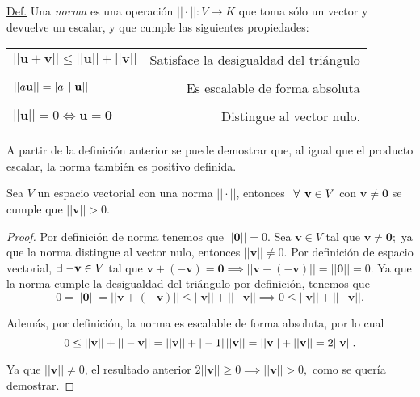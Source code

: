 \documentclass[12pt]{article}
\newenvironment{corolario}[2][Corolario]{\begin{trivlist}
\item[\hskip \labelsep {\bfseries #1}]}{\end{trivlist}}
\begin{document}
\begin{tcolorbox}
\underline{Def.} Una \textit{norma} es una operación $||\cdot||:V\rightarrow K$ que toma sólo un vector y devuelve un escalar, y que cumple las siguientes propiedades:

\begin{center}
    \begin{tabular}{lr}
        $||\mathbf{u}+\mathbf{v}|| \leq ||\mathbf{u}|| + ||\mathbf{v}||$ & Satisface la desigualdad del triángulo \\ \\
        $||a\mathbf{u}|| = |a|\hspace{0.5mm}||\mathbf{u}||$ & Es escalable de forma absoluta \\ \\
        $||\mathbf{u}||=0\iff \mathbf{u}=\mathbf{0}$ & Distingue al vector nulo.
    \end{tabular}
\end{center}

\end{tcolorbox}{}

A partir de la definición anterior se puede demostrar que, al igual que el producto escalar, la norma también es positivo definida.

\begin{corolario} {}
    Sea $V$ un espacio vectorial con una norma $||\cdot ||$, entonces $\hspace{1.5mm}\forall\hspace{1.5mm} \mathbf{v}\in V$ con $\mathbf{v}\neq\mathbf{0}$ se cumple que $||\mathbf{v}||>0.$

\begin{proof}
    Por definición de norma tenemos que $||\mathbf{0}||=0$. Sea $\mathbf{v}\in V$ tal que $\mathbf{v}\neq\mathbf{0};$ ya que la norma distingue al vector nulo, entonces $||\mathbf{v}||\neq 0.$ Por definición de espacio vectorial, $\exists\hspace{1mm} \mathbf{-v}\in V$ tal que $\mathbf{v}+(-\mathbf{v})=\mathbf{0}\implies ||\mathbf{v}+(-\mathbf{v})||=||\mathbf{0}||=0$. Ya que la norma cumple la desigualdad del triángulo por definición, tenemos que $$0=||\mathbf{0}||=||\mathbf{v}+(-\mathbf{v})||\leq ||\mathbf{v}||+||\mathbf{-v}||\implies 0\leq ||\mathbf{v}||+||\mathbf{-v}||.$$

\noindent Además, por definición, la norma es escalable de forma absoluta, por lo cual $$0\leq ||\mathbf{v}||+||-\mathbf{v}||=||\mathbf{v}||+|-1|\hspace{0.5mm} ||\mathbf{v}||=||\mathbf{v}||+||\mathbf{v}||=2||\mathbf{v}||.$$

\noindent Ya que $||\mathbf{v}||\neq 0$, el resultado anterior $2||\mathbf{v}||\geq 0\implies ||\mathbf{v}||>0,$ como se quería demostrar.

\end{proof}

\end{corolario}
\end{document}
